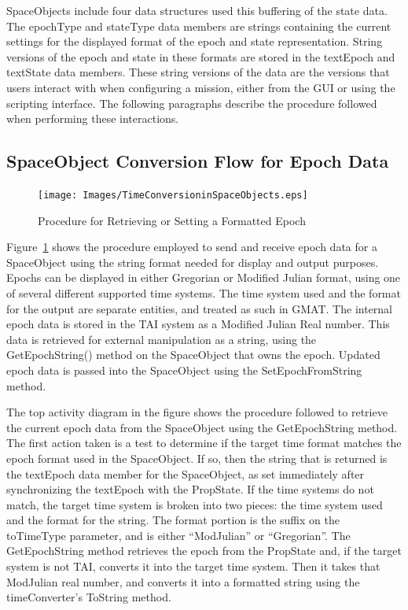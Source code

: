 SpaceObjects include four data structures used this buffering of the state data.  The epochType and
stateType data members are strings containing the current settings for the displayed format of the
epoch and state representation.  String versions of the epoch and state in these formats are stored
in the textEpoch and textState data members.  These string versions of the data are the versions
that users interact with when configuring a mission, either from the GUI or using the scripting
interface.  The following paragraphs describe the procedure followed when performing these
interactions.

\subsection{SpaceObject Conversion Flow for Epoch Data}

\begin{figure}
\begin{center}
\texttt{[image: Images/TimeConversioninSpaceObjects.eps]}
\caption{\label{figure:TimeConversion}Procedure for Retrieving or Setting a Formatted Epoch}
\end{center}
\end{figure}

Figure~\ref{figure:TimeConversion} shows the procedure employed to send and receive epoch data for a
SpaceObject using the string format needed for display and output purposes.  Epochs can be
displayed in either Gregorian or Modified Julian format, using one of several different supported
time systems.  The time system used and the format for the output are separate entities, and
treated as such in GMAT.  The internal epoch data is stored in the TAI system as a Modified Julian
Real number.  This data is retrieved for external manipulation as a string, using the
GetEpochString() method on the SpaceObject that owns the epoch.  Updated epoch data is passed into
the SpaceObject using the SetEpochFromString method.

The top activity diagram in the figure shows the procedure followed to retrieve the current epoch
data from the SpaceObject using the GetEpochString method.  The first action taken is a test to
determine if the target time format matches the epoch format used in the SpaceObject.  If so, then
the string that is returned is the textEpoch data member for the SpaceObject, as set immediately
after synchronizing the textEpoch with the PropState.  If the time systems do not match, the target
time system is broken into two pieces: the time system used and the format for the string. The
format portion is the suffix on the toTimeType parameter, and is either ``ModJulian'' or
``Gregorian''.  The GetEpochString method retrieves the epoch from the PropState and, if the
 target system is not TAI, converts it into the target time system.  Then it takes that ModJulian
real number, and converts it into a formatted string using the timeConverter's ToString method.

